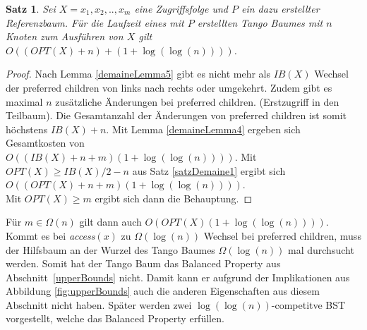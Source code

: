 \documentclass[a4paper,12pt]{article}
\newtheorem{Satz}{Satz}[section]
\begin{document}
\begin{Satz} \label{demaineSatz2}
	Sei $X = x_1, x_2,.., x_m$ eine Zugriffsfolge und $P$ ein dazu erstellter Referenzbaum. 
	Für die Laufzeit eines mit $P$ erstellten Tango Baumes mit $n$ Knoten zum Ausführen von $X$ gilt $O\left(\left(\mathit{OPT}\left(X\right) + n\right)  + \left(  1 + \log\left(\log \left(n\right)\right)\right)   \right)$.
\end{Satz}
\begin{proof}
	Nach Lemma \ref{demaineLemma5} gibt es nicht mehr als  $\mathit{IB}\left(X\right)$ Wechsel der preferred children von links nach rechts oder umgekehrt. Zudem gibt es maximal $n$ zusätzliche Änderungen bei preferred children. (Erstzugriff in den Teilbaum). Die Gesamtanzahl der Änderungen von preferred children ist somit höchstens $\mathit{IB}\left(X\right) + n$. Mit Lemma \ref{demaineLemma4} ergeben sich Gesamtkosten von\\ $O\left(\left(\mathit{IB}\left(X\right) + n +m \right) \left( 1 + \log \left(\log\left(n\right)\right)\right) \right)$. Mit $\mathit{OPT}\left(X\right) \geq \mathit{IB}\left(X\right) /2 -n $ aus Satz \ref{satzDemaine1} ergibt sich 
	$O\left(\left(\mathit{OPT}\left(X\right) + n +m \right) \left( 1 + \log \left(\log\left(n\right)\right)\right) \right)$.\\ Mit $\mathit{OPT}\left(X\right) \geq m$ ergibt sich dann die Behauptung.
\end{proof}
\noindent Für $m \in \Omega\left(n\right)$ gilt dann auch 
$O\left(	\mathit{OPT}\left(X\right) 	\left( 1 + \log \left(\log \left(n\right)\right)\right)	 \right)$.\\
 Kommt es bei \textit{access}$\left(x\right)$ zu $\Omega\left(\log\left(n\right)\right)$ Wechsel bei preferred children, muss der Hilfsbaum an der Wurzel des Tango Baumes $\Omega\left(\log\left(n\right)\right)$ mal durchsucht werden. Somit hat der Tango Baum das Balanced Property aus \mbox{Abschnitt \ref{upperBounds}} nicht. Damit kann er aufgrund der Implikationen aus Abbildung \ref{fig:upperBounds} auch die anderen Eigenschaften aus diesem Abschnitt nicht haben. Später werden zwei $\log\left(\log\left(n\right)\right)$-competitve BST vorgestellt, welche das Balanced Property erfüllen.      
\end{document}
